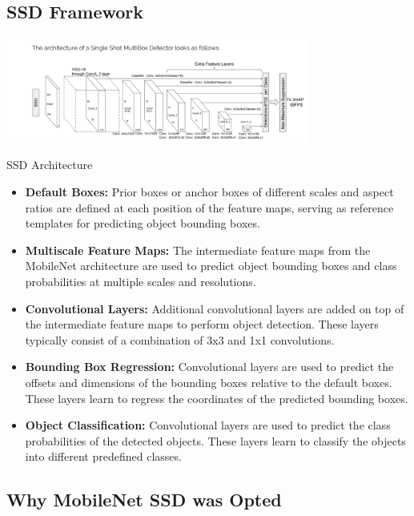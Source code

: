 \documentclass[a4paper,12pt,oneside]{book}
\begin{document}
\subsection{SSD Framework}

\begin{center}
    \centering
    \includegraphics[width=0.75\textwidth]{Screenshot (2150).png}
    
\end{center}
\centering
SSD Architecture

\begin{itemize}
    \item \textbf{Default Boxes:} Prior boxes or anchor boxes of different scales and aspect ratios are defined at each position of the feature maps, serving as reference templates for predicting object bounding boxes.
    \item \textbf{Multiscale Feature Maps:} The intermediate feature maps from the MobileNet architecture are used to predict object bounding boxes and class probabilities at multiple scales and resolutions.
    \item \textbf{Convolutional Layers:} Additional convolutional layers are added on top of the intermediate feature maps to perform object detection. These layers typically consist of a combination of 3x3 and 1x1 convolutions.
    \item \textbf{Bounding Box Regression:} Convolutional layers are used to predict the offsets and dimensions of the bounding boxes relative to the default boxes. These layers learn to regress the coordinates of the predicted bounding boxes.
    \item \textbf{Object Classification:} Convolutional layers are used to predict the class probabilities of the detected objects. These layers learn to classify the objects into different predefined classes.
\end{itemize}

\subsection{Why MobileNet SSD was Opted}
\end{document}
